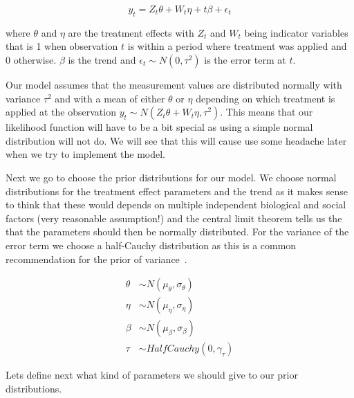 \documentclass[12pt,a4paper,leqno]{report}
\theoremstyle{plain}
\theoremstyle{definition}
\theoremstyle{remark}
\begin{document}
\begin{def}\label{singlepatientmodel}
    \begin{equation}\label{}
        y_t = Z_t\theta + W_t\eta + t\beta + \epsilon_t
    \end{equation}
\end{def} where \(\theta \) and \(\eta \) are the treatment effects with \(Z_t\) and \(W_t\) being indicator
variables that is 1 when observation \(t\) is within a period where treatment was applied and
0 otherwise. \(\beta\) is the trend and \(\epsilon_{t} \sim N(0,\tau^2) \) is the error term at \(t\).

Our model assumes that the measurement values are distributed normally with
variance \(\tau^2\) and with a mean of either \(\theta \) or \(\eta \) depending on which
treatment is applied at the observation \(y_t \sim N(Z_t\theta + W_t\eta, \tau^2)\).
This means that our likelihood function will have to be a bit special as using a simple
normal distribution will not do. We will see that this will cause use some headache
later when we try to implement the model.

Next we go to choose the prior distributions for our model. We choose
normal distributions for the treatment effect parameters and the trend as it makes sense to think
that these would depends on multiple independent biological and social
factors (very reasonable assumption!) and the central limit theorem tells us the that
the parameters should then be normally distributed. For the variance of the error term we choose
a half-Cauchy distribution as this is a common recommendation for the prior of variance\ \cite{variancepriors}.

\begin{align}\label{}
    \theta &\sim N(\mu_{\theta}, \sigma_{\theta}) \\
    \eta &\sim N(\mu_{\eta}, \sigma_{\eta}) \nonumber \\
    \beta &\sim N(\mu_{\beta}, \sigma_{\beta}) \nonumber \\
    \tau &\sim HalfCauchy(0, \gamma_{\tau}) \nonumber
\end{align}

Lets define next what kind of parameters we should give to our prior distributions.

\end{document}
